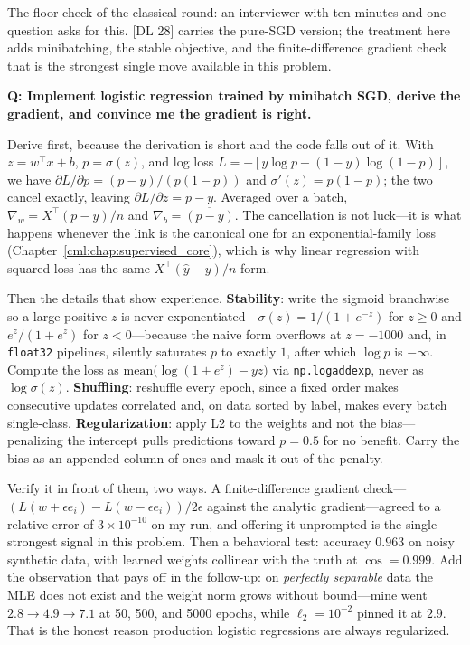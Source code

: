 The floor check of the classical round: an interviewer with ten minutes and one question asks for this. [DL 28] carries the pure-SGD version; the treatment here adds minibatching, the stable objective, and the finite-difference gradient check that is the strongest single move available in this problem.

\begin{interviewq}
\textbf{Q: Implement logistic regression trained by minibatch SGD, derive the gradient, and convince me the gradient is right.}

 \quad {} \quad \badgefreq{\freqhigh}

\stronganswer

Derive first, because the derivation is short and the code falls out of it. With $z = w^\top x + b$, $p = \sigma(z)$, and log loss $L = -[y \log p + (1-y)\log(1-p)]$, we have $\partial L/\partial p = (p-y)/(p(1-p))$ and $\sigma'(z) = p(1-p)$; the two cancel exactly, leaving $\partial L / \partial z = p - y$. Averaged over a batch, $\nabla_w = X^\top(p - y)/n$ and $\nabla_b = \overline{(p-y)}$. The cancellation is not luck---it is what happens whenever the link is the canonical one for an exponential-family loss (Chapter~\ref{cml:chap:supervised_core}), which is why linear regression with squared loss has the same $X^\top(\hat y - y)/n$ form.

Then the details that show experience. \textbf{Stability}: write the sigmoid branchwise so a large positive $z$ is never exponentiated---$\sigma(z) = 1/(1+e^{-z})$ for $z \ge 0$ and $e^z/(1+e^z)$ for $z < 0$---because the naive form overflows at $z = -1000$ and, in \texttt{float32} pipelines, silently saturates $p$ to exactly $1$, after which $\log p$ is $-\infty$. Compute the loss as $\mathrm{mean}\big(\log(1+e^{z}) - yz\big)$ via \texttt{np.logaddexp}, never as $\log \sigma(z)$. \textbf{Shuffling}: reshuffle every epoch, since a fixed order makes consecutive updates correlated and, on data sorted by label, makes every batch single-class. \textbf{Regularization}: apply L2 to the weights and not the bias---penalizing the intercept pulls predictions toward $p = 0.5$ for no benefit. Carry the bias as an appended column of ones and mask it out of the penalty.

Verify it in front of them, two ways. A finite-difference gradient check---$(L(w + \epsilon e_i) - L(w - \epsilon e_i))/2\epsilon$ against the analytic gradient---agreed to a relative error of $3 \times 10^{-10}$ on my run, and offering it unprompted is the single strongest signal in this problem. Then a behavioral test: accuracy $0.963$ on noisy synthetic data, with learned weights collinear with the truth at $\cos = 0.999$. Add the observation that pays off in the follow-up: on \emph{perfectly separable} data the MLE does not exist and the weight norm grows without bound---mine went $2.8 \to 4.9 \to 7.1$ at 50, 500, and 5000 epochs, while $\ell_2 = 10^{-2}$ pinned it at $2.9$. That is the honest reason production logistic regressions are always regularized.


\end{interviewq}
